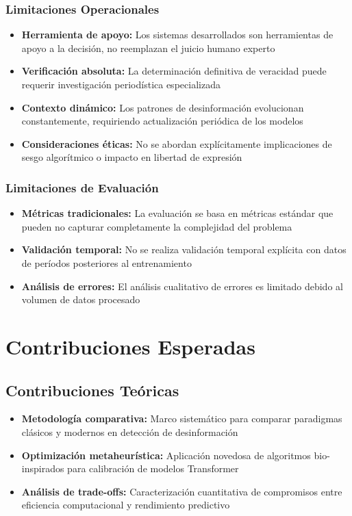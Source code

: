 \subsubsection{Limitaciones Operacionales}
\begin{itemize}
    \item \textbf{Herramienta de apoyo:} Los sistemas desarrollados son herramientas de apoyo a la decisión, no reemplazan el juicio humano experto
    \item \textbf{Verificación absoluta:} La determinación definitiva de veracidad puede requerir investigación periodística especializada
    \item \textbf{Contexto dinámico:} Los patrones de desinformación evolucionan constantemente, requiriendo actualización periódica de los modelos
    \item \textbf{Consideraciones éticas:} No se abordan explícitamente implicaciones de sesgo algorítmico o impacto en libertad de expresión
\end{itemize}

\subsubsection{Limitaciones de Evaluación}
\begin{itemize}
    \item \textbf{Métricas tradicionales:} La evaluación se basa en métricas estándar que pueden no capturar completamente la complejidad del problema
    \item \textbf{Validación temporal:} No se realiza validación temporal explícita con datos de períodos posteriores al entrenamiento
    \item \textbf{Análisis de errores:} El análisis cualitativo de errores es limitado debido al volumen de datos procesado
\end{itemize}

\section{Contribuciones Esperadas}

\subsection{Contribuciones Teóricas}
\begin{itemize}
    \item \textbf{Metodología comparativa:} Marco sistemático para comparar paradigmas clásicos y modernos en detección de desinformación
    \item \textbf{Optimización metaheurística:} Aplicación novedosa de algoritmos bio-inspirados para calibración de modelos Transformer
    \item \textbf{Análisis de trade-offs:} Caracterización cuantitativa de compromisos entre eficiencia computacional y rendimiento predictivo
\end{itemize}

